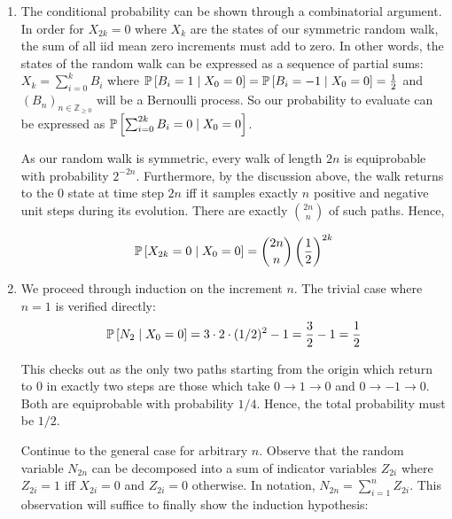 \documentclass[12pt]{article}%
\begin{document}
\begin{enumerate}
  \item The conditional probability can be shown through a combinatorial argument. In order for $X_{2k} = 0$ where $X_{k}$ are the states of our symmetric random walk, the sum of all iid mean zero increments must add to zero. In other words, the states of the random walk can be expressed as a sequence of partial sums: $X_{k} = \sum_{i=0}^{k} B_{i}$ where $\mathbb{P}\left[B_{i} = 1 \mid X_0 =0\right] = \mathbb{P}\left[B_i = -1 \mid X_0 = 0\right] = \frac{1}{2}$ and $(B_{n})_{n \in \mathbb{Z}_{\geq 0}}$ will be a Bernoulli process. So our probability to evaluate can be expressed as $\mathbb{P}\left[\sum_{i=0}^{2k} B_{i} = 0\mid X_{0} = 0\right]$.

        As our random walk is symmetric, every walk of length $2n$ is equiprobable with probability $2^{-2n}$.
        Furthermore, by the discussion above, the walk returns to the $0$ state at time step $2n$ iff it samples exactly $n$ positive and negative unit steps during its evolution. There are exactly $
        \binom{2n}{n}$ of such paths. Hence,

        \[\mathbb{P}\left[X_{{2k}} = 0 \mid X_0 = 0\right] = \binom{2n}{n} \left(\frac{1}{2}\right)^{2k}\]

  \item
        We proceed through induction on the increment $n$. The trivial case where $n = 1$ is verified directly:
%
        \begin{align*}
          \mathbb{P}\left[N_{{2}} \mid X_0 = 0\right] = 3 \cdot 2 \cdot (1/2)^{2} - 1 = \frac{3}{2} - 1 = \frac{1}{2}
        \end{align*}

        This checks out as the only two paths starting from the origin which return to $0$ in exactly two steps are those which take $0 \rightarrow 1 \rightarrow 0$ and $0 \rightarrow -1 \rightarrow 0$. Both are equiprobable with probability $1/4$. Hence, the total probability must be $1/2$.

        Continue to the general case for arbitrary $n$. Observe that the random variable $N_{2n}$ can be decomposed into a sum of indicator variables $Z_{2i}$ where $Z_{2i} = 1$ iff $X_{2i} = 0$ and $Z_{2i} = 0$ otherwise. In notation, $N_{2n} = \sum_{i=1}^{n} Z_{2i}$. This observation will suffice to finally show the induction hypothesis:


\end{enumerate}
\end{document}
